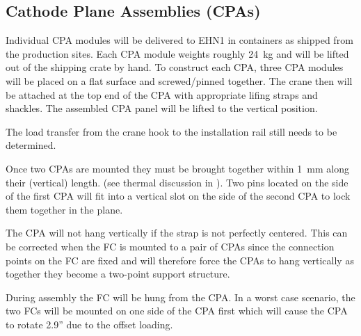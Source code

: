 \subsection{Cathode Plane Assemblies (CPAs)}



Individual CPA modules will be delivered to EHN1 in containers as shipped from the production sites.  Each CPA module weights roughly 24~kg and will be lifted out of the shipping crate by hand. %
%
%
To construct each CPA, three CPA modules
will be placed on a flat surface and screwed/pinned together.  
  The crane  then will be attached at the top end of the CPA with appropriate lifing straps and shackles.  The assembled CPA panel will be lifted to the vertical position.  

The load transfer from the crane hook to the installation rail still needs to be determined.  

Once two CPAs %
are mounted they must be brought together within 1~mm along their (vertical) length.  (see thermal discussion in ).  Two pins located on the side of the first CPA will fit into a vertical slot on the side of the second CPA to lock them together in the plane.  

The CPA %
will not hang vertically %
if the strap is not perfectly centered. %
This can be corrected when the FC is mounted to a pair of CPAs %
since the connection points on the FC are fixed and will therefore %
force the CPAs %
to hang vertically %
as together they become a two-point support structure.  

During assembly the FC will be hung from the CPA.  In a worst case scenario, the two FCs will be mounted on one side of the CPA first which will cause the CPA to rotate 2.9'' due to the offset loading.  



